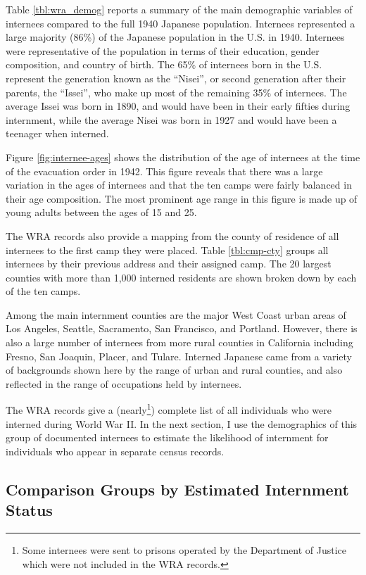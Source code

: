 \documentclass[12pt]{article}
\begin{document}
Table \ref{tbl:wra_demog} reports a summary of the main demographic variables
of internees compared to the full 1940 Japanese population.
Internees represented a large majority (86\%)
of the Japanese population in the U.S. in 1940.
Internees were representative of the population in terms of their education,
gender composition, and country of birth.
The 65\% of internees born in the U.S.
represent the generation known as the ``Nisei'',
or second generation after their parents,
the ``Issei'', who make up most of the remaining 35\% of internees.
The average Issei was born in 1890,
and would have been in their early fifties during internment,
while the average Nisei was born in 1927
and would have been a teenager when interned.

Figure \ref{fig:internee-ages} shows the distribution
of the age of internees at the time of the evacuation order in 1942.
This figure reveals that there was a large variation in the ages of internees
and that the ten camps were fairly balanced in their age composition.
The most prominent age range in this figure is made up of young adults
between the ages of 15 and 25.

The WRA records also provide a mapping from the county of residence of all internees to the first camp they were placed.
Table \ref{tbl:cmp-cty} groups all internees by their previous address and their assigned camp.
The 20 largest counties with more than 1,000 interned residents are shown broken down by each of the ten camps.

Among the main internment counties are the major West Coast urban areas of Los Angeles, Seattle, Sacramento, San Francisco, and Portland.
However, there is also a large number of internees from more rural counties in California including Fresno, San Joaquin, Placer, and Tulare.
Interned Japanese came from a variety of backgrounds shown here by the range of urban and rural counties,
and also reflected in the range of occupations held by internees.

The WRA records give a
(nearly\footnote{Some internees were sent to prisons operated by the Department of Justice which were not included in the WRA records.})
complete list of all individuals who were interned during World War II.
In the next section, I use the demographics of this group of documented internees
to estimate the likelihood of internment for individuals who appear in separate census records.
\subsection{Comparison Groups by Estimated Internment Status}
\label{sec:org5c2202d}
\end{document}

